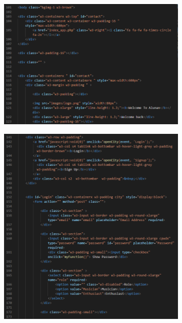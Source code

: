 \begin{enumerate}[1.]
\begin{figure}[h]
\begin{subfigure}[b]{0.7\textwidth}
            \includegraphics[width=\textwidth]{mainmatter/images/frontend/code/loginsignup.png}
            \label{fig:sub1}
        \end{subfigure}
        \hspace{0.05\textwidth}
        \begin{subfigure}[b]{0.7\textwidth}
            \centering
            \includegraphics[width=\textwidth]{mainmatter/images/frontend/code/loginsignup2.png}

\end{subfigure}
\end{figure}
\end{enumerate}
